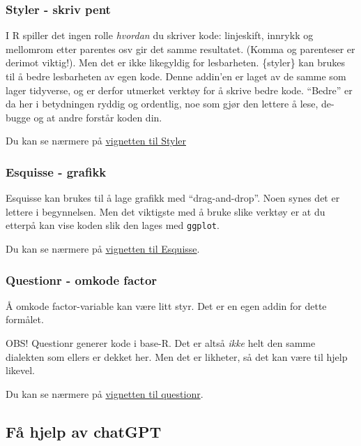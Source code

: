 \documentclass[
  letterpaper,
  DIV=11,
  numbers=noendperiod]{scrreprt}
\theoremstyle{definition}
\theoremstyle{remark}
\begin{document}
\hypertarget{styler---skriv-pent}{%
\subsubsection{Styler - skriv pent}\label{styler---skriv-pent}}

I R spiller det ingen rolle \emph{hvordan} du skriver kode: linjeskift,
innrykk og mellomrom etter parentes osv gir det samme resultatet. (Komma
og parenteser er derimot viktig!). Men det er ikke likegyldig for
lesbarheten. \{styler\} kan brukes til å bedre lesbarheten av egen kode.
Denne addin'en er laget av de samme som lager tidyverse, og er derfor
utmerket verktøy for å skrive bedre kode. ``Bedre'' er da her i
betydningen ryddig og ordentlig, noe som gjør den lettere å lese,
de-bugge og at andre forstår koden din.

Du kan se nærmere på
\href{https://www.tidyverse.org/blog/2017/12/styler-1.0.0/}{vignetten
til Styler}

\hypertarget{esquisse---grafikk}{%
\subsubsection{Esquisse - grafikk}\label{esquisse---grafikk}}

Esquisse kan brukes til å lage grafikk med ``drag-and-drop''. Noen synes
det er lettere i begynnelsen. Men det viktigste med å bruke slike
verktøy er at du etterpå kan vise koden slik den lages med
\texttt{ggplot}.

Du kan se nærmere på
\href{https://cran.r-project.org/web/packages/esquisse/vignettes/get-started.html}{vignetten
til Esquisse}.

\hypertarget{questionr---omkode-factor}{%
\subsubsection{Questionr - omkode
factor}\label{questionr---omkode-factor}}

Å omkode factor-variable kan være litt styr. Det er en egen addin for
dette formålet.

OBS! Questionr generer kode i base-R. Det er altså \emph{ikke} helt den
samme dialekten som ellers er dekket her. Men det er likheter, så det
kan være til hjelp likevel.

Du kan se nærmere på
\href{https://cran.r-project.org/web/packages/questionr/vignettes/recoding_addins.html}{vignetten
til questionr}.

\hypertarget{fuxe5-hjelp-av-chatgpt}{%
\subsection{Få hjelp av chatGPT}\label{fuxe5-hjelp-av-chatgpt}}
\end{document}
